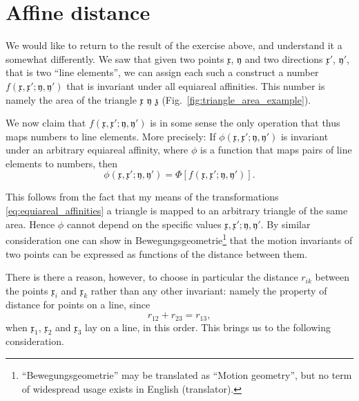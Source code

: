 \documentclass[11pt]{book} \usepackage{amssymb}
\newcommand{\myvec}[1]{\mathfrak{#1}}
\newcommand{\vecx}{\myvec{x}}
\newcommand{\vecy}{\myvec{y}}
\begin{document}
\section{Affine distance}

We would like to return to the result of the exercise above, and understand it
a somewhat differently. We saw that given two points $\vecx$, $\vecy$
and two directions $\vecx'$, $\vecy'$, that is two ``line elements'', 
we can assign each such a construct a number 
$f(\vecx,\vecx';\vecy,\vecy')$ that is invariant under all
equiareal affinities. This number is namely the area of the triangle 
$\vecx$ $\vecy$ $\myvec{z}$ (Fig.~\ref{fig:triangle_area_example}).

We now claim that $f(\vecx,\vecx';\vecy,\vecy')$ is in some
sense the only operation that thus maps numbers to line elements. More 
precisely: If $\phi(\vecx,\vecx';\vecy,\vecy')$ is invariant
under an arbitrary equiareal affinity, where $\phi$ is a function that maps
pairs of line elements to numbers, then
$$ \phi(\vecx,\vecx';\vecy,\vecy') = \Phi\left[f(\vecx,\vecx';\vecy,\vecy')\right].$$

This follows from the fact that my means of the transformations 
\eqref{eq:equiareal_affinities} a triangle is mapped to an arbitrary triangle
of the same area. Hence $\phi$ cannot depend on the specific values
$\vecx,\vecx';\vecy,\vecy'$. By similar consideration one can
show in Bewegungsgeometrie\footnote{``Bewegungsgeometrie'' may be 
translated as
``Motion geometry'', but no term of widespread usage exists in English (translator).} 
that the motion invariants of two points can be 
expressed as functions of the distance between them.

There is there a reason, however, to choose in particular the distance $r_{ik}$
between the points $\vecx_i$ and $\vecx_k$ rather than any other
invariant: namely the property of distance for points on a line, since
$$r_{12}+r_{23}=r_{13},$$
when $\vecx_1$,  $\vecx_2$ and $\vecx_3$ lay on a line, in this 
order. This brings us to the following consideration.
 
\end{document}
